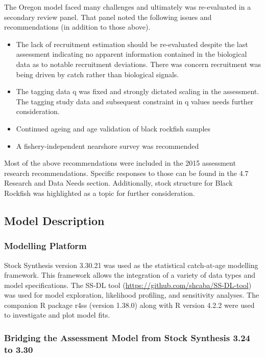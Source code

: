 \documentclass[11pt,
  letterpaper,
]{article}
\providecommand{\tightlist}{%
  \setlength{\itemsep}{0pt}\setlength{\parskip}{0pt}}
\providecommand{\tightlist}{%
  \setlength{\itemsep}{0pt}\setlength{\parskip}{0pt}}
\begin{document}
The Oregon model faced many challenges and ultimately was re-evaluated in a secondary review panel. That panel noted the following issues and recommendations (in addition to those above).

\begin{itemize}
\tightlist
\item
  The lack of recruitment estimation should be re-evaluated despite the last assessment indicating no apparent information contained in the biological data as to notable recruitment deviations. There was concern recruitment was being driven by catch rather than biological signals.
\item
  The tagging data q was fixed and strongly dictated scaling in the assessment. The tagging study data and subsequent constraint in q values needs further consideration.
\item
  Continued ageing and age validation of black rockfish samples
\item
  A fishery-independent nearshore survey was recommended
\end{itemize}

Most of the above recommendations were included in the 2015 assessment research recommendations. Specific responses to those can be found in the 4.7 Research and Data Needs section. Additionally, stock structure for Black Rockfish was highlighted as a topic for further consideration.

\hypertarget{model-description}{%
\subsection{Model Description}\label{model-description}}

\hypertarget{modelling-platform}{%
\subsubsection{Modelling Platform}\label{modelling-platform}}

Stock Synthesis version 3.30.21 was used as the statistical catch-at-age modelling framework. This framework allows the integration of a variety of data types and model specifications. The SS-DL tool (\url{https://github.com/shcaba/SS-DL-tool}) was used for model exploration, likelihood profiling, and sensitivity analyses. The companion R package r4ss (version 1.38.0) along with R version 4.2.2 were used to investigate and plot model fits.

\hypertarget{bridging-the-assessment-model-from-stock-synthesis-3.24-to-3.30}{%
\subsubsection{Bridging the Assessment Model from Stock Synthesis 3.24 to 3.30}\label{bridging-the-assessment-model-from-stock-synthesis-3.24-to-3.30}}
\end{document}
